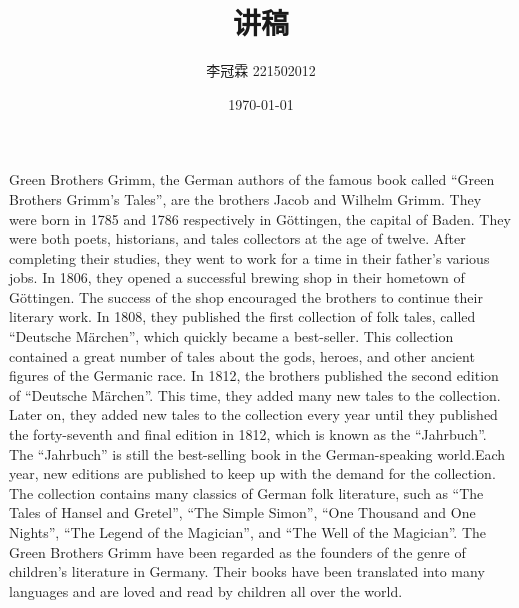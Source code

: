 \documentclass[12pt, a4paper, oneside,UTF8]{ctexart}
\title{讲稿}
\author{李冠霖 221502012}
\date{\today}
\begin{document}
\maketitle
\tableofcontents
\newpage
Green Brothers Grimm, the German authors of the famous book called “Green Brothers Grimm’s Tales”, are the brothers Jacob and Wilhelm Grimm.
They were born in 1785 and 1786 respectively in Göttingen, the capital of Baden.
They were both poets, historians, and tales collectors at the age of twelve. After completing their studies, they went to work for a time in their father’s various jobs.
In 1806, they opened a successful brewing shop in their hometown of Göttingen.
The success of the shop encouraged the brothers to continue their literary work. 
In 1808, they published the first collection of folk tales, called “Deutsche Märchen”, which quickly became a best-seller.
This collection contained a great number of tales about the gods, heroes, and other ancient figures of the Germanic race.
In 1812, the brothers published the second edition of “Deutsche Märchen”. This time, they added many new tales to the collection.
Later on, they added new tales to the collection every year until they published the forty-seventh and final edition in 1812, which is known as the “Jahrbuch”.
The “Jahrbuch” is still the best-selling book in the German-speaking world.Each year, new editions are published to keep up with the demand for the collection. 
The collection contains many classics of German folk literature, such as “The Tales of Hansel and Gretel”, “The Simple Simon”, “One Thousand and One Nights”, “The Legend of the Magician”, and “The Well of the Magician”.
The Green Brothers Grimm have been regarded as the founders of the genre of children’s literature in Germany. 
Their books have been translated into many languages and are loved and read by children all over the world.

\end{document}
